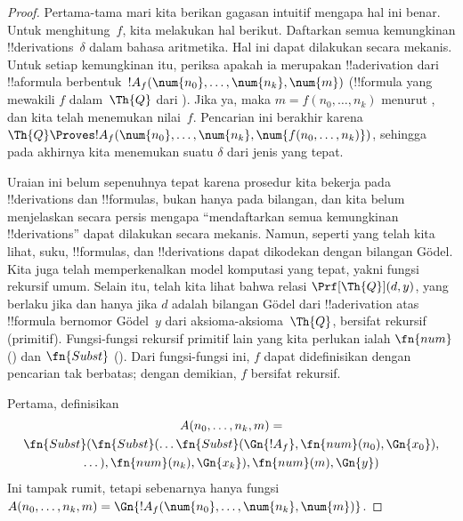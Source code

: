\documentclass[../../../include/open-logic-section]{subfiles}
\begin{document}
\begin{proof}
Pertama-tama mari kita berikan gagasan intuitif mengapa hal ini benar. Untuk
menghitung~$f$, kita melakukan hal berikut. Daftarkan semua kemungkinan
!!{derivation}s~$\delta$ dalam bahasa aritmetika. Hal ini dapat dilakukan
secara mekanis. Untuk setiap kemungkinan itu, periksa apakah ia merupakan
!!a{derivation} dari !!a{formula} berbentuk~$!A_f(\num{n_0}, \dots,
\num{n_k}, \num{m})$ (!!{formula} yang mewakili $f$ dalam~$\Th{Q}$ dari
). Jika ya, maka $m = f(n_0, \dots, n_k)$ menurut
, dan kita telah menemukan nilai~$f$. Pencarian ini berakhir
karena $\Th{Q} \Proves !A_f(\num{n_0}, \dots, \num{n_k},
\num{f(n_0, \dots, n_k)})$, sehingga pada akhirnya kita menemukan suatu
$\delta$ dari jenis yang tepat.

Uraian ini belum sepenuhnya tepat karena prosedur kita bekerja pada
!!{derivation}s dan !!{formula}s, bukan hanya pada bilangan, dan kita belum
menjelaskan secara persis mengapa ``mendaftarkan semua kemungkinan
!!{derivation}s'' dapat dilakukan secara mekanis. Namun, seperti yang telah
kita lihat, suku, !!{formula}s, dan !!{derivation}s dapat dikodekan dengan
bilangan G\"odel. Kita juga telah memperkenalkan model komputasi yang tepat,
yakni fungsi rekursif umum. Selain itu, telah kita lihat bahwa relasi
$\Prf[\Th{Q}](d,y)$, yang berlaku jika dan hanya jika $d$ adalah bilangan
G\"odel dari !!a{derivation} atas !!{formula} bernomor G\"odel~$y$ dari
aksioma-aksioma~$\Th{Q}$, bersifat rekursif (primitif). Fungsi-fungsi rekursif
primitif lain yang kita perlukan ialah $\fn{num}$
() dan $\fn{Subst}$
(). Dari fungsi-fungsi ini, $f$ dapat
didefinisikan dengan pencarian tak berbatas; dengan demikian, $f$ bersifat rekursif.

Pertama, definisikan
\begin{multline*}
  A(n_0, \dots, n_k, m) = \\
  \fn{Subst}(\fn{Subst}(\dots\fn{Subst}(\Gn{!A_f}, \fn{num}(n_0), \Gn{x_0}),\\ \dots),
  \fn{num}(n_k),  \Gn{x_k}), \fn{num}(m), \Gn{y})
\end{multline*}
Ini tampak rumit, tetapi sebenarnya hanya fungsi
$A(n_0, \dots, n_k, m) =
\Gn{!A_f(\num{n_0}, \dots, \num{n_k}, \num{m})}$.


\end{proof}
\end{document}

